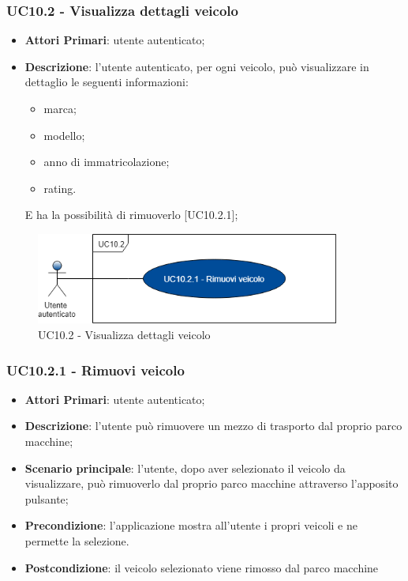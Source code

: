 \subsubsection{UC10.2 - Visualizza dettagli veicolo}
\begin{itemize}
	\item \textbf{Attori Primari}: utente autenticato;
	\item \textbf{Descrizione}: l'utente autenticato, per ogni veicolo, può visualizzare in dettaglio le seguenti informazioni:
	\begin{itemize}
		\item marca;
		\item modello;
		\item anno di immatricolazione;
		\item rating.
	\end{itemize}
	E ha la possibilità di rimuoverlo [UC10.2.1];
\end{itemize}
\begin{figure}[H]
	\includegraphics[width=10cm]{res/images/UC10-2Dettagliveicolo.png}
	\centering
	\caption{UC10.2 - Visualizza dettagli veicolo}
\end{figure}
\subsubsection{UC10.2.1 - Rimuovi veicolo}
\begin{itemize}
	\item \textbf{Attori Primari}: utente autenticato;
	\item \textbf{Descrizione}: l'utente può rimuovere un mezzo di trasporto dal proprio parco macchine;
	\item \textbf{Scenario principale}: l'utente, dopo aver selezionato il veicolo da visualizzare, può rimuoverlo dal proprio parco macchine attraverso l'apposito pulsante;
	\item \textbf{Precondizione}: l'applicazione mostra all'utente i propri veicoli e ne permette la selezione.
	\item \textbf{Postcondizione}: il veicolo selezionato viene rimosso dal parco macchine
\end{itemize}